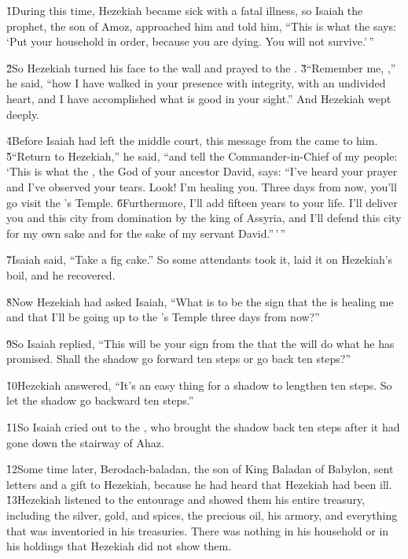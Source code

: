 \v{1}During this time, Hezekiah became sick with a fatal illness, so Isaiah the prophet, the son of Amoz, approached him and told him, ``This is what the  says: `Put your household in order, because you are dying. You will not survive.'\,''

\v{2}So Hezekiah turned his face to the wall and prayed to the . \v{3}``Remember me, ,'' he said, ``how I have walked in your presence with integrity, with an undivided heart, and I have accomplished what is good in your sight.'' And Hezekiah wept deeply.

\v{4}Before Isaiah had left the middle court, this message from the  came to him. \v{5}``Return to Hezekiah,'' he said, ``and tell the Commander-in-Chief of my people: `This is what the , the God of your ancestor David, says: ``I've heard your prayer and I've observed your tears. Look! I'm healing you. Three days from now, you'll go visit the 's Temple. \v{6}Furthermore, I'll add fifteen years to your life. I'll deliver you and this city from domination by the king of Assyria, and I'll defend this city for my own sake and for the sake of my servant David.''\,'\,''

\v{7}Isaiah said, ``Take a fig cake.'' So some attendants took it, laid it on Hezekiah's boil, and he recovered.

\v{8}Now Hezekiah had asked Isaiah, ``What is to be the sign that the  is healing me and that I'll be going up to the 's Temple three days from now?''

\v{9}So Isaiah replied, ``This will be your sign from the  that the  will do what he has promised. Shall the shadow go forward ten steps or go back ten steps?''

\v{10}Hezekiah answered, ``It's an easy thing for a shadow to lengthen ten steps. So let the shadow go backward ten steps.''

\v{11}So Isaiah cried out to the , who brought the shadow back ten steps after it had gone down the stairway of Ahaz.

\v{12}Some time later, Berodach-baladan, the son of King Baladan of Babylon, sent letters and a gift to Hezekiah, because he had heard that Hezekiah had been ill. \v{13}Hezekiah listened to the entourage and showed them his entire treasury, including the silver, gold, and spices, the precious oil, his armory, and everything that was inventoried in his treasuries. There was nothing in his household or in his holdings that Hezekiah did not show them.

